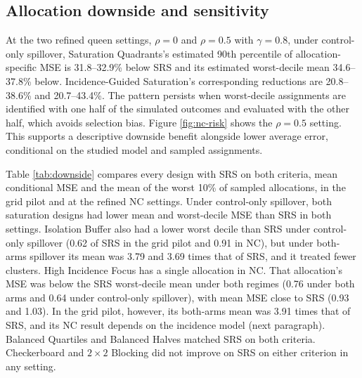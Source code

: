 \documentclass[11pt]{article}
\begin{document}
\subsection{Allocation downside and
sensitivity}\label{allocation-downside-and-sensitivity}

At the two refined queen settings, $\rho=0$ and $\rho=0.5$ with $\gamma=0.8$, under control-only spillover, Saturation Quadrants's estimated 90th percentile of allocation-specific MSE is 31.8--32.9\%
below SRS and its estimated worst-decile mean 34.6--37.8\% below. Incidence-Guided
Saturation's corresponding reductions are 20.8--38.6\% and 20.7--43.4\%.
The pattern persists when worst-decile assignments are identified with one half of the simulated outcomes and evaluated with the other half, which avoids selection bias. Figure \ref{fig:nc-risk} shows the $\rho=0.5$ setting. This supports a descriptive downside benefit
alongside lower average error, conditional on the studied model and
sampled assignments.

Table \ref{tab:downside} compares every design with SRS on both criteria, mean conditional MSE and the mean of the worst 10\% of sampled allocations, in the grid pilot and at the refined NC settings. Under control-only spillover, both saturation designs had lower mean and worst-decile MSE than SRS in both settings. Isolation Buffer also had a lower worst decile than SRS under control-only spillover (0.62 of SRS in the grid pilot and 0.91 in NC), but under both-arms spillover its mean was 3.79 and 3.69 times that of SRS, and it treated fewer clusters. High Incidence Focus has a single allocation in NC. That allocation's MSE was below the SRS worst-decile mean under both regimes (0.76 under both arms and 0.64 under control-only spillover), with mean MSE close to SRS (0.93 and 1.03). In the grid pilot, however, its both-arms mean was 3.91 times that of SRS, and its NC result depends on the incidence model (next paragraph). Balanced Quartiles and Balanced Halves matched SRS on both criteria. Checkerboard and $2\times2$ Blocking did not improve on SRS on either criterion in any setting.
\end{document}
